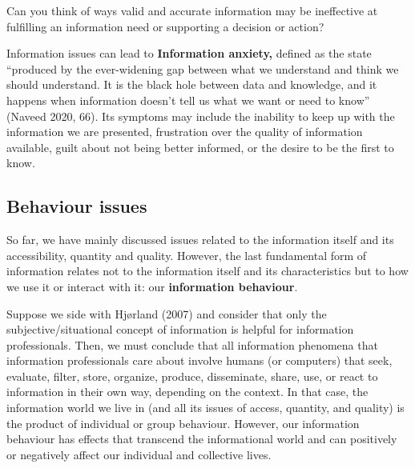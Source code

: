 \documentclass[
  letterpaper,
  DIV=11,
  numbers=noendperiod]{scrreprt}
\begin{document}
\begin{tcolorbox}[enhanced jigsaw, arc=.35mm, bottomrule=.15mm, bottomtitle=1mm, breakable, colback=white, colbacktitle=quarto-callout-tip-color!10!white, colframe=quarto-callout-tip-color-frame, coltitle=black, left=2mm, leftrule=.75mm, opacityback=0, opacitybacktitle=0.6, rightrule=.15mm, title=\textcolor{quarto-callout-tip-color}{\faLightbulb}\hspace{0.5em}{Pause and reflect}, titlerule=0mm, toprule=.15mm, toptitle=1mm]

Can you think of ways valid and accurate information may be ineffective
at fulfilling an information need or supporting a decision or action?

\end{tcolorbox}

Information issues can lead to \textbf{Information anxiety,} defined as
the state ``produced by the ever-widening gap between what we understand
and think we should understand. It is the black hole between data and
knowledge, and it happens when information doesn't tell us what we want
or need to know'' (Naveed 2020, 66). Its symptoms may include the
inability to keep up with the information we are presented, frustration
over the quality of information available, guilt about not being better
informed, or the desire to be the first to know.

\subsection{Behaviour issues}\label{behaviour-issues}

So far, we have mainly discussed issues related to the information
itself and its accessibility, quantity and quality. However, the last
fundamental form of information relates not to the information itself
and its characteristics but to how we use it or interact with it: our
\textbf{information behaviour}.

Suppose we side with Hjørland (2007) and consider that only the
subjective/situational concept of information is helpful for information
professionals. Then, we must conclude that all information phenomena
that information professionals care about involve humans (or computers)
that seek, evaluate, filter, store, organize, produce, disseminate,
share, use, or react to information in their own way, depending on the
context. In that case, the information world we live in (and all its
issues of access, quantity, and quality) is the product of individual or
group behaviour. However, our information behaviour has effects that
transcend the informational world and can positively or negatively
affect our individual and collective lives.
\end{document}
